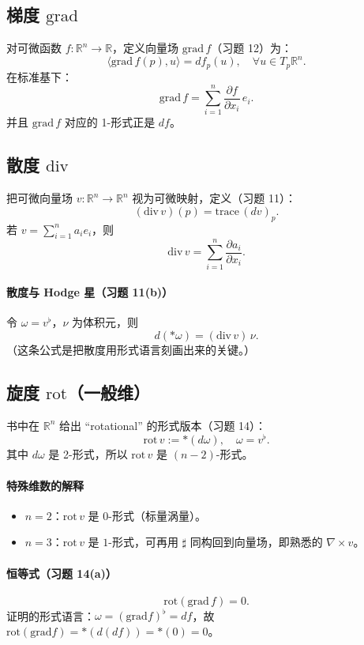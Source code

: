 \documentclass[11pt,a4paper]{article}
\newcommand{\R}{\mathbb{R}}
\newcommand{\vol}{\nu}
\newcommand{\ip}[2]{\langle #1,#2\rangle}
\begin{document}
\subsection{梯度 \texorpdfstring{$\mathrm{grad}$}{grad}}
对可微函数 $f:\R^n\to\R$，定义向量场 $\mathrm{grad}\,f$（习题 12）为：
\[
\boxed{\ \ip{\mathrm{grad}\,f(p)}{u}=df_p(u),\quad \forall u\in T_p\R^n. }
\]
在标准基下：
\[
\boxed{\ \mathrm{grad}\,f=\sum_{i=1}^n \frac{\partial f}{\partial x_i}\,e_i. }
\]
并且 $\mathrm{grad}\,f$ 对应的 1-形式正是 $df$。

\subsection{散度 \texorpdfstring{$\mathrm{div}$}{div}}
把可微向量场 $v:\R^n\to\R^n$ 视为可微映射，定义（习题 11）：
\[
\boxed{\ (\mathrm{div}\,v)(p)=\mathrm{trace}\,(dv)_p. }
\]
若 $v=\sum_{i=1}^n a_i e_i$，则
\[
\boxed{\ \mathrm{div}\,v=\sum_{i=1}^n \frac{\partial a_i}{\partial x_i}. }
\]

\paragraph{散度与 Hodge 星（习题 11(b)）}
令 $\omega=v^\flat$，$\vol$ 为体积元，则
\[
\boxed{\ d(\ast\omega) = (\mathrm{div}\,v)\,\vol. }
\]
（这条公式是把散度用形式语言刻画出来的关键。）

\subsection{旋度 \texorpdfstring{$\mathrm{rot}$}{rot}（一般维）}
书中在 $\R^n$ 给出 ``rotational'' 的形式版本（习题 14）：
\[
\boxed{\ \mathrm{rot}\,v := \ast(d\omega),\quad \omega=v^\flat. }
\]
其中 $d\omega$ 是 2-形式，所以 $\mathrm{rot}\,v$ 是 $(n-2)$-形式。

\paragraph{特殊维数的解释}
\begin{itemize}
  \item $n=2$：$\mathrm{rot}\,v$ 是 $0$-形式（标量涡量）。
  \item $n=3$：$\mathrm{rot}\,v$ 是 $1$-形式，可再用 $\sharp$ 同构回到向量场，即熟悉的 $\nabla\times v$。
\end{itemize}

\paragraph{恒等式（习题 14(a)）}
\[
\boxed{\ \mathrm{rot}(\mathrm{grad}\,f)=0. }
\]
证明的形式语言：$\omega=(\mathrm{grad}f)^\flat=df$，故 $\mathrm{rot}(\mathrm{grad}f)=\ast(d(df))=\ast(0)=0$。
\end{document}
